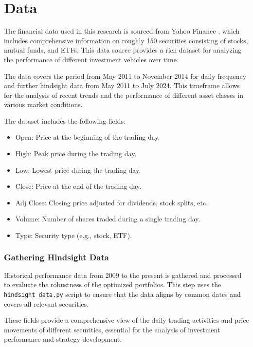 \section{Data}
The financial data used in this research is sourced from Yahoo Finance \citep{yfinance}, which includes comprehensive information on roughly 150 securities consisting of stocks, mutual funds, and ETFs. This data source provides a rich dataset for analyzing the performance of different investment vehicles over time.

The data covers the period from May 2011 to November 2014 for daily frequency and further hindsight data from May 2011 to July 2024. This timeframe allows for the analysis of recent trends and the performance of different asset classes in various market conditions.

The dataset includes the following fields:
\begin{itemize}
    \item Open: Price at the beginning of the trading day.
    \item High: Peak price during the trading day.
    \item Low: Lowest price during the trading day.
    \item Close: Price at the end of the trading day.
    \item Adj Close: Closing price adjusted for dividends, stock splits, etc.
    \item Volume: Number of shares traded during a single trading day.
    \item Type: Security type (e.g., stock, ETF).
\end{itemize}

\subsubsection{Gathering Hindsight Data}
Historical performance data from 2009 to the present is gathered and processed to evaluate the robustness of the optimized portfolios. This step uses the \texttt{hindsight\_data.py} script to ensure that the data aligns by common dates and covers all relevant securities.

These fields provide a comprehensive view of the daily trading activities and price movements of different securities, essential for the analysis of investment performance and strategy development.

\newpage
